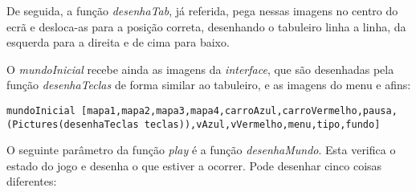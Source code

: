 \documentclass[a4paper]{report}
\begin{document}
De seguida, a função \textit{desenhaTab}, já referida, pega nessas imagens no centro do ecrã e desloca-as para a posição correta, desenhando o tabuleiro linha a linha, da esquerda para a direita e de cima para baixo.

O \textit{mundoInicial} recebe ainda as imagens da \textit{interface}, que são desenhadas pela função \textit{desenhaTeclas} de forma similar ao tabuleiro, e as imagens do menu e afins:

\begin{lstlisting}
mundoInicial [mapa1,mapa2,mapa3,mapa4,carroAzul,carroVermelho,pausa,(Pictures(desenhaTeclas teclas)),vAzul,vVermelho,menu,tipo,fundo]
\end{lstlisting}

O seguinte parâmetro da função \textit{play} é a função \textit{desenhaMundo}. Esta verifica o estado do jogo e desenha o que estiver a ocorrer. Pode desenhar cinco coisas diferentes: 
\end{document}
